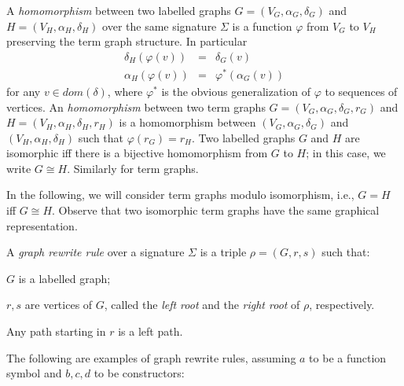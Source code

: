 \documentclass{LMCS}
\newcommand{\sigone}{\Sigma}
\newcommand{\vsone}{V}
\newcommand{\ordone}{\alpha}
\newcommand{\labelone}{\delta}
\newcommand{\rootone}{r}
\newcommand{\roottwo}{s}
\newcommand{\verone}{v}
\newcommand{\tgone}{G}
\newcommand{\tgtwo}{H}
\newcommand{\rrone}{\rho}
\newcommand{\homone}{\varphi}
\newcommand{\domain}[1]{\mathit{dom}(#1)}
\newenvironment{varitemize}
{
\begin{list}{\labelitemi}
{\setlength{\itemsep}{0.0mm}
 \setlength{\topsep}{0.0mm}
 \setlength{\parindent}{0.0mm}
 \setlength{\parskip}{0.0mm}
 \setlength{\parsep}{0.0mm}
 \setlength{\partopsep}{0.0mm}
 \setlength{\leftmargin}{15pt}
 \setlength{\labelsep}{5pt}
 \setlength{\labelwidth}{10pt}}}
{
 \end{list} 
}
\begin{document}
\begin{defi}[Homomorphism]
A \emph{homomorphism} between two labelled graphs 
$\tgone=(\vsone_\tgone,\ordone_\tgone,\labelone_\tgone)$ and 
$\tgtwo=(\vsone_\tgtwo,\ordone_\tgtwo,\labelone_\tgtwo)$ over the same 
signature $\sigone$ is a function $\homone$ from $\vsone_\tgone$ to $\vsone_\tgtwo$ 
preserving the term graph structure. In particular
\begin{eqnarray*}
  \labelone_\tgtwo(\homone(\verone))&=&\labelone_\tgone(\verone)\\
  \ordone_\tgtwo(\homone(\verone))&=&\homone^*(\ordone_\tgone(\verone))
\end{eqnarray*}
for any $\verone\in\domain{\labelone}$, where $\homone^*$ is the obvious
generalization of $\homone$ to sequences of vertices. 
An \emph{homomorphism} between two term graphs 
$\tgone=(\vsone_\tgone,\ordone_\tgone,\labelone_\tgone,\rootone_\tgone)$ and 
$\tgtwo=(\vsone_\tgtwo,\ordone_\tgtwo,\labelone_\tgtwo,\rootone_\tgtwo)$ is
a homomorphism between $(\vsone_\tgone,\ordone_\tgone,\labelone_\tgone)$ and 
$(\vsone_\tgtwo,\ordone_\tgtwo,\labelone_\tgtwo)$ such that
$\homone(\rootone_\tgone)=\rootone_\tgtwo$. Two labelled graphs $\tgone$ and $\tgtwo$ are 
isomorphic iff there is a bijective homomorphism from
$\tgone$ to $\tgtwo$; in this case, we write $\tgone\cong\tgtwo$. Similarly
for term graphs.
\end{defi}
In the following, we will consider term graphs modulo isomorphism, i.e., $\tgone=\tgtwo$
iff $\tgone\cong\tgtwo$. Observe that two isomorphic term graphs have the same graphical
representation.
\begin{defi}
A \emph{graph rewrite rule} over a signature $\sigone$ 
is a triple $\rrone=(\tgone,\rootone,\roottwo)$ such that:
\begin{varitemize}
\item
  $\tgone$ is a labelled graph;
\item
  $\rootone,\roottwo$ are vertices of $\tgone$, called 
  the \emph{left root} and the \emph{right root} of $\rrone$,
  respectively.
\item
  Any path starting in $\rootone$ is a
  left path.
\end{varitemize}
\end{defi}
The following are examples of graph rewrite rules, assuming $a$ to be a function
symbol and $b,c,d$ to be constructors:
\end{document}
